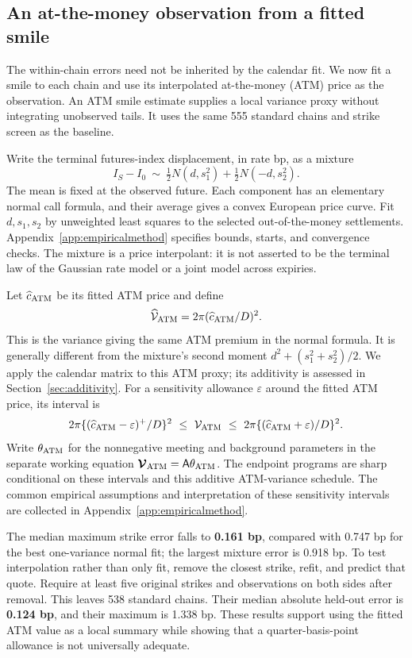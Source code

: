\subsection{An at-the-money observation from a fitted smile}\label{sec:smileextension}
The within-chain errors need not be inherited by the calendar fit. We now fit a smile to each chain and use its interpolated at-the-money (ATM) price as the observation. An ATM smile estimate supplies a local variance proxy without integrating unobserved tails. It uses the same 555 standard chains and strike screen as the baseline.

Write the terminal futures-index displacement, in rate bp, as a mixture
\begin{equation}\label{eq:mixture}
I_S-I_0\ \sim\ \tfrac12 N(d,s_1^2)+\tfrac12 N(-d,s_2^2).
\end{equation}
The mean is fixed at the observed future. Each component has an elementary normal call formula, and their average gives a convex European price curve. Fit $d,s_1,s_2$ by unweighted least squares to the selected out-of-the-money settlements. Appendix~\ref{app:empiricalmethod} specifies bounds, starts, and convergence checks. The mixture is a price interpolant: it is not asserted to be the terminal law of the Gaussian rate model or a joint model across expiries.

Let $\widehat c_{\rm ATM}$ be its fitted ATM price and define
\begin{equation}\label{eq:smileatm}
\widehat{\mathcal V}_{\rm ATM}=2\pi(\widehat c_{\rm ATM}/D)^2.
\end{equation}
This is the variance giving the same ATM premium in the normal formula. It is generally different from the mixture's second moment $d^2+(s_1^2+s_2^2)/2$. We apply the calendar matrix to this ATM proxy; its additivity is assessed in Section~\ref{sec:additivity}. For a sensitivity allowance $\varepsilon$ around the fitted ATM price, its interval is
\[
2\pi\{(\widehat c_{\rm ATM}-\varepsilon)^+/D\}^2
\ \leq\ \mathcal V_{\rm ATM}\ \leq\
2\pi\{(\widehat c_{\rm ATM}+\varepsilon)/D\}^2.
\]
Write $\theta_{\rm ATM}$ for the nonnegative meeting and background parameters in the separate working equation $\boldsymbol{\mathcal V}_{\rm ATM}=\mathsf A\theta_{\rm ATM}$. The endpoint programs are sharp conditional on these intervals and this additive ATM-variance schedule. The common empirical assumptions and interpretation of these sensitivity intervals are collected in Appendix~\ref{app:empiricalmethod}.

The median maximum strike error falls to \textbf{0.161 bp}, compared with 0.747 bp for the best one-variance normal fit; the largest mixture error is 0.918 bp. To test interpolation rather than only fit, remove the closest strike, refit, and predict that quote. Require at least five original strikes and observations on both sides after removal. This leaves 538 standard chains. Their median absolute held-out error is \textbf{0.124 bp}, and their maximum is 1.338 bp. These results support using the fitted ATM value as a local summary while showing that a quarter-basis-point allowance is not universally adequate.

